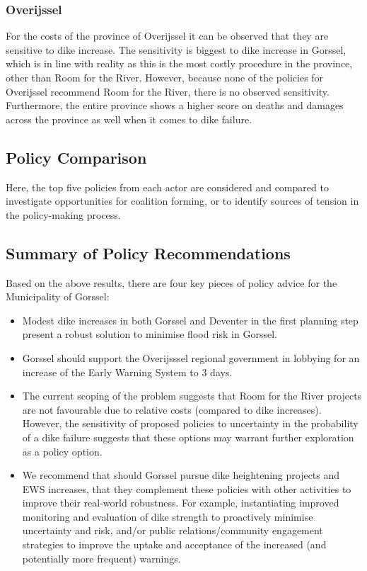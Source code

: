 \subsubsection{Overijssel}

For the costs of the province of Overijssel it can be observed that they are sensitive to dike increase. The sensitivity is biggest to dike increase in Gorssel, which is in line with reality as this is the most costly procedure in the province, other than Room for the River. However, because none of the policies for Overijssel recommend Room for the River, there is no observed sensitivity. Furthermore, the entire province shows a higher score on deaths and damages across the province as well when it comes to dike failure. 

\subsection{Policy Comparison}
Here, the top five policies from each actor are considered and compared to investigate opportunities for coalition forming, or to identify sources of tension in the policy-making process.

\subsection{Summary of Policy Recommendations}
Based on the above results, there are four key pieces of policy advice for the Municipality of Gorssel:
\begin{itemize}
    \item Modest dike increases in both Gorssel and Deventer in the first planning step present a robust solution to minimise flood risk in Gorssel.
    \item Gorssel should support the Overijsssel regional government in lobbying for an increase of the Early Warning System to 3 days.
    \item The current scoping of the problem suggests that Room for the River projects are not favourable due to relative costs (compared to dike increases). However, the sensitivity of proposed policies to uncertainty in the probability of a dike failure suggests that these options may warrant further exploration as a policy option.
    \item We recommend that should Gorssel pursue dike heightening projects and EWS increases, that they complement these policies with other activities to improve their real-world robustness. For example, instantiating improved monitoring and evaluation of dike strength to proactively minimise uncertainty and risk, and/or public relations/community engagement strategies to improve the uptake and acceptance of the increased (and potentially more frequent) warnings.
\end{itemize}